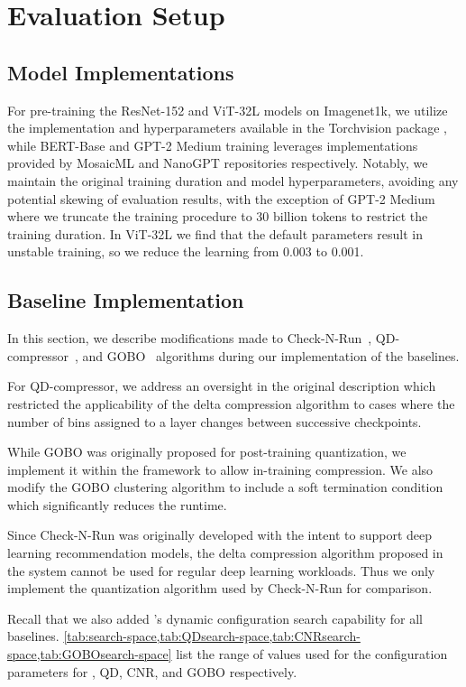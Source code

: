 \section{Evaluation Setup}


\subsection{Model Implementations}
\label{app:model-imps}

For pre-training the ResNet-152 and ViT-32L models on Imagenet1k, we utilize the implementation and hyperparameters available in the Torchvision package \cite{torchvision}, while BERT-Base and GPT-2 Medium training leverages implementations provided by MosaicML \cite{mosiac-bert} and NanoGPT \cite{nangpt} repositories respectively. Notably, we maintain the original training duration and model hyperparameters, avoiding any potential skewing of evaluation results, with the exception of GPT-2 Medium where we truncate the training procedure to 30 billion tokens to restrict the training duration. In ViT-32L we find that the default parameters result in unstable training, so we reduce the learning from 0.003 to 0.001.

\subsection{Baseline Implementation}
\label{all:baseline-imps}

In this section, we describe modifications made to Check-N-Run~\cite{checknrun}, QD-compressor~\cite{QD}, and GOBO~\cite{gobo} algorithms during our implementation of the baselines. 


For QD-compressor, we address an oversight in the original description which restricted the applicability of the delta compression algorithm to cases where the number of bins assigned to a layer changes between successive checkpoints.

While GOBO was originally proposed for post-training quantization, we implement it within the \sys framework to allow in-training compression. We also modify the GOBO clustering algorithm to include a soft termination condition which significantly reduces the runtime.

Since Check-N-Run was originally developed with the intent to support deep learning recommendation models, the delta compression algorithm proposed in the system cannot be used for regular deep learning workloads. Thus we only implement the quantization algorithm \cite{adaptive-uniform-quant} used by Check-N-Run for comparison.


Recall that we also added \sys's dynamic configuration search capability for all baselines. \cref{tab:search-space,tab:QDsearch-space,tab:CNRsearch-space,tab:GOBOsearch-space} list the range of values used for the configuration parameters for \sys, QD, CNR, and GOBO respectively. 




